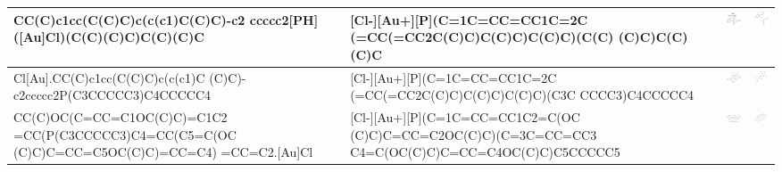 \begin{landscape}
\begin{longtable}{m{7cm}m{8cm}m{2.3cm}m{2.3cm}}
 CC(C)c1cc(C(C)C)c(c(c1)C(C)C)-c2 ccccc2[PH]([Au]Cl)(C(C)(C)C)C(C)(C)C & 
 [Cl-][Au+][P](C=1C=CC=CC1C=2C (=CC(=CC2C(C)C)C(C)C)C(C)C)(C(C) (C)C)C(C)(C)C & 
 \includegraphics[width=2.2cm]{imagenes/sigmaAldrich/Chloro[2-di-tert-butyl(2,4,6-triisopropylbiphenyl)phosphine] gold(I).jpeg} & 
 \includegraphics[width=2.3cm]{imagenes/sciFinder/pdf/Chloro[2-di-tert-butyl(2,4,6-triisopropylbiphenyl)phosphine] gold(I).pdf} \\
\hline



 Cl[Au].CC(C)c1cc(C(C)C)c(c(c1)C (C)C)-c2ccccc2P(C3CCCCC3)C4CCCCC4 & 
 [Cl-][Au+][P](C=1C=CC=CC1C=2C (=CC(=CC2C(C)C)C(C)C)C(C)C)(C3C CCCC3)C4CCCCC4 & 
 \includegraphics[width=2.2cm]{imagenes/sigmaAldrich/Chloro[2-dicyclohexyl(2,4,6-trisopropylbiphenyl)phosphine]gold(I).png} & 
 \includegraphics[width=2.2cm]{imagenes/sciFinder/pdf/Chloro[2-dicyclohexyl(2,4,6-trisopropylbiphenyl)phosphine]gold(I).pdf} \\
\hline



 CC(C)OC(C=CC=C1OC(C)C)=C1C2 =CC(P(C3CCCCC3)C4=CC(C5=C(OC (C)C)C=CC=C5OC(C)C)=CC=C4) =CC=C2.[Au]Cl & 
 [Cl-][Au+][P](C=1C=CC=CC1C2=C(OC (C)C)C=CC=C2OC(C)C)(C=3C=CC=CC3 C4=C(OC(C)C)C=CC=C4OC(C)C)C5CCCCC5 & 
 \includegraphics[width=2.2cm]{imagenes/sigmaAldrich/pdf/BisPhePhos XD gold(I) chloride.pdf} & 
 \includegraphics[width=2.2cm]{imagenes/sciFinder/pdf/BisPhePhos XD gold(I) chloride.pdf} \\
\hline




\end{longtable}
\end{landscape}
